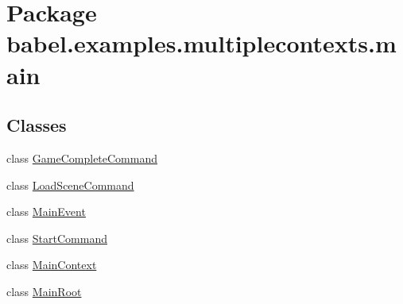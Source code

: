 \hypertarget{namespacebabel_1_1examples_1_1multiplecontexts_1_1main}{\section{Package babel.\-examples.\-multiplecontexts.\-main}
\label{namespacebabel_1_1examples_1_1multiplecontexts_1_1main}
}
\subsection*{Classes}
\begin{DoxyCompactItemize}
\item 
class \hyperlink{classbabel_1_1examples_1_1multiplecontexts_1_1main_1_1_game_complete_command}{Game\-Complete\-Command}
\item 
class \hyperlink{classbabel_1_1examples_1_1multiplecontexts_1_1main_1_1_load_scene_command}{Load\-Scene\-Command}
\item 
class \hyperlink{classbabel_1_1examples_1_1multiplecontexts_1_1main_1_1_main_event}{Main\-Event}
\item 
class \hyperlink{classbabel_1_1examples_1_1multiplecontexts_1_1main_1_1_start_command}{Start\-Command}
\item 
class \hyperlink{classbabel_1_1examples_1_1multiplecontexts_1_1main_1_1_main_context}{Main\-Context}
\item 
class \hyperlink{classbabel_1_1examples_1_1multiplecontexts_1_1main_1_1_main_root}{Main\-Root}
\end{DoxyCompactItemize}

